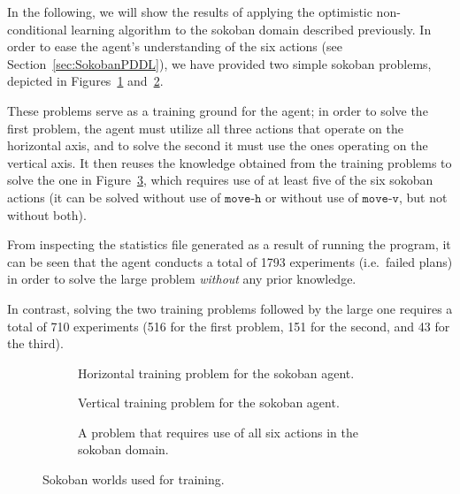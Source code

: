 \documentclass[../Master.tex]{subfiles}
\begin{document}
In the following, we will show the results of applying the optimistic non-conditional learning algorithm to the sokoban domain described previously. In order to ease the agent's understanding of the  six actions (see Section~\ref{sec:SokobanPDDL}), we have provided two simple sokoban problems, depicted in Figures~\ref{fig:results:train1} and~\ref{fig:results:train2}. 

These problems serve as a training ground for the agent; in order to solve the first problem, the agent must utilize all three actions that operate on the horizontal axis, and to solve the second it must use the ones operating on the vertical axis. It then reuses the knowledge obtained from the training problems to solve the one in Figure~\ref{fig:results:train3}, which requires use of at least five of the six sokoban actions (it can be solved without use of $\texttt{move-h}$ or without use of $\texttt{move-v}$, but not without both).

From inspecting the statistics file generated as a result of running the program, it can be seen that the agent conducts a total of 1793 experiments (i.e.\ failed plans) in order to solve the large problem \textit{without} any prior knowledge.

In contrast, solving the two training problems followed by the large one requires a total of 710 experiments (516 for the first problem, 151 for the second, and 43 for the third).

\begin{figure}
    \begin{subfigure}{0.3\textwidth}
        \resizebox{\linewidth}{!}{}
        \caption{Horizontal training problem for the sokoban agent.}\label{fig:results:train1}
    \end{subfigure}
    \begin{subfigure}{0.3\textwidth}
        \resizebox{\linewidth}{!}{}
        \caption{Vertical training problem for the sokoban agent.}\label{fig:results:train2}
    \end{subfigure}
    \begin{subfigure}{0.3\textwidth}
        \resizebox{\linewidth}{!}{}
        \caption{A problem that requires use of all six actions in the sokoban domain.}\label{fig:results:train3}
    \end{subfigure}
    \caption{Sokoban worlds used for training.}\label{fig:results:sokoTraining}
\end{figure}
\end{document}
